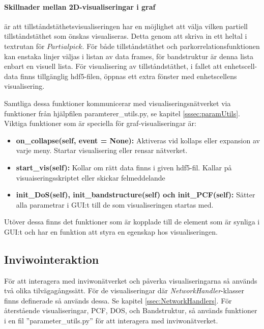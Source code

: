 \newpage

\paragraph{Skillnader mellan 2D-visualiseringar i graf} är att tillståndstäthetsvisualiseringen har en möjlighet att välja vilken partiell tillståndstäthet som önskas visualiseras. Detta genom att skriva in ett heltal i textrutan för $Partial pick$. För både tillståndstäthet och parkorrelationsfunktionen kan enstaka linjer väljas i listan av data frames, för bandstruktur är denna lista enbart en visuell lista. För visualisering av tillståndstäthet, i fallet att enhetscell-data finns tillgänglig hdf5-filen, öppnas ett extra fönster med enhetscellens visualisering.
\newline

Samtliga dessa funktioner kommunicerar med visualiseringsnätverket via funktioner från hjälpfilen paramterer\_utils.py, se kapitel \ref{sssec:paramUtils}.
Viktiga funktioner som är speciella för graf-visualiseringar är:
\begin{itemize}
    \setlength\itemsep{0em}
    \item \textbf{on\_collapse(self, event = None): } Aktiveras vid kollaps eller expansion av varje meny. Startar visualisering eller rensar nätverket.
    \item \textbf{start\_vis(self): }Kollar om rätt data finns i given hdf5-fil. Kallar på visuaiseringsskriptet eller skickar felmeddelande
    \item \textbf{init\_DoS(self), init\_bandstructure(self) och init\_PCF(self): } Sätter alla parametrar i GUI:t till de som visualiseringen startas med.
\end{itemize}

Utöver dessa finns det funktioner som är kopplade till de element som är synliga i GUI:t och har en funktion att styra en egenskap hos visualiseringen.

\subsection{Inviwointeraktion}
För att interagera med inviwonätverket och påverka visualiseringarna så används två olika tilvägagångssätt. För de visualiseringar där \textit{NetworkHandler}-klasser finns definerade så används dessa. Se kapitel \ref{ssec:NetworkHandlers}. För återstående visualiseringar, PCF, DOS, och Bandstruktur, så används funktioner i en fil ''parameter\_utils.py'' för att interagera med inviwonätverket.


